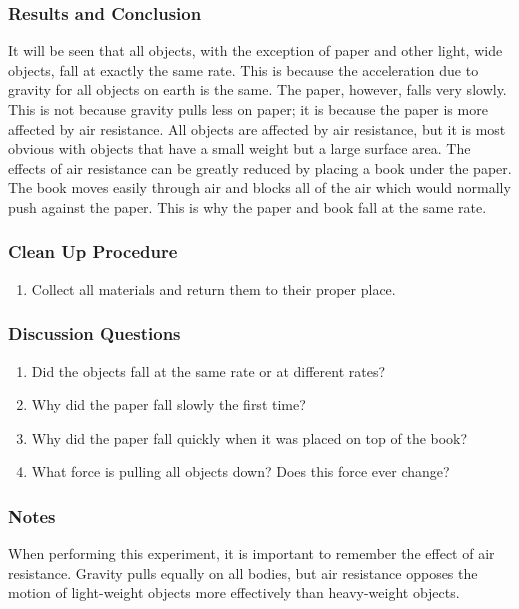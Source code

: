 \subsubsection*{Results and Conclusion}
It will be seen that all objects, with the exception of paper and other light, wide objects, fall at exactly the same rate. This is because the acceleration due to gravity for all objects on earth is the same.  
The paper, however, falls very slowly. This is not because gravity pulls less on paper; it is because the paper is more affected by air resistance. All objects are affected by air resistance, but it is most obvious with objects that have a small weight but a large surface area. The effects of air resistance can be greatly reduced by placing a book under the paper. The book moves easily through air and blocks all of the air which would normally push against the paper. This is why the paper and book fall at the same rate.  

\subsubsection*{Clean Up Procedure}
\begin{enumerate}
\item{Collect all materials and return them to their proper place.} 
\end{enumerate}

\subsubsection*{Discussion Questions}
\begin{enumerate}
\item{Did the objects fall at the same rate or at different rates?}
\item{Why did the paper fall slowly the first time?}
\item{Why did the paper fall quickly when it was placed on top of the book?}
\item{What force is pulling all objects down? Does this force ever change?}
\end{enumerate}

\subsubsection*{Notes}
When performing this experiment, it is important to remember the effect of air resistance.  Gravity pulls equally on all bodies, but air resistance opposes the motion of light-weight objects more effectively than heavy-weight objects.

